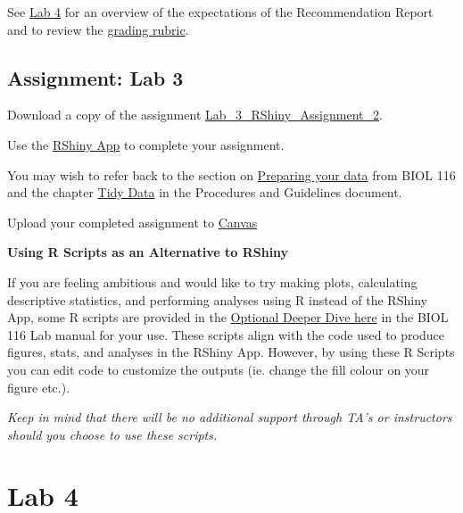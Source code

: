\documentclass[
]{book}
\begin{document}
See \href{https://ubco-biology.github.io/BIOL-125-Lab-Manual-Summer/assignment-recommendation-report.html}{Lab 4} for an overview of the expectations of the Recommendation Report and to review the \href{https://ubco-biology.github.io/BIOL-125-Lab-Manual-Summer/recommendation-report-rubric-1.html}{grading rubric}.

\hypertarget{assignment-lab-3}{%
\chapter*{Assignment: Lab 3}\label{assignment-lab-3}}

Download a copy of the assignment \href{files/Lab_3_RShiny_Assignment_2.pdf}{Lab\_3\_RShiny\_Assignment\_2}.

Use the \href{https://openscience.ok.ubc.ca/shiny/BIOL-116/}{RShiny App} to complete your assignment.

You may wish to refer back to the section on \href{https://ubco-biology.github.io/BIOL-116-Lab-Manual/preparing-your-data.html}{Preparing your data} from BIOL 116 and the chapter \href{https://ubco-biology.github.io/Procedures-and-Guidelines/tidy-data.html}{Tidy Data} in the Procedures and Guidelines document.

Upload your completed assignment to \href{https://canvas.ubc.ca/}{Canvas}

\textbf{Using R Scripts as an Alternative to RShiny}

If you are feeling ambitious and would like to try making plots, calculating descriptive statistics, and performing analyses using R instead of the RShiny App, some R scripts are provided in the \href{https://ubco-biology.github.io/BIOL-116-Lab-Manual/lab-7-activity.html}{Optional Deeper Dive here} in the BIOL 116 Lab manual for your use. These scripts align with the code used to produce figures, stats, and analyses in the RShiny App. However, by using these R Scripts you can edit code to customize the outputs (ie. change the fill colour on your figure etc.).

\emph{Keep in mind that there will be no additional support through TA's or instructors should you choose to use these scripts.}

\hypertarget{part-lab-4}{%
\part*{Lab 4}\label{part-lab-4}}
\end{document}
